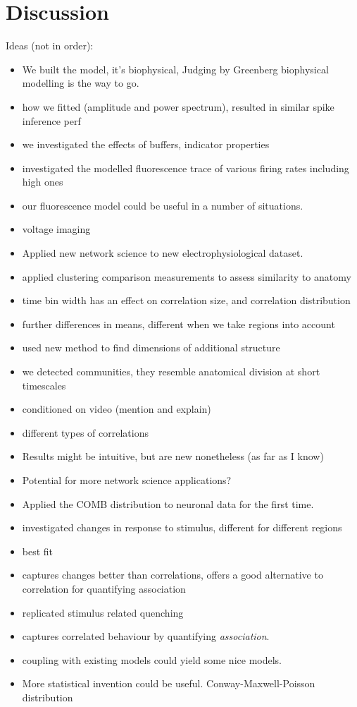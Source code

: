 \chapter{Discussion}
Ideas (not in order):
\begin{itemize}
  \item We built the model, it's biophysical, Judging by Greenberg biophysical modelling is the way to go.
  \item how we fitted (amplitude and power spectrum), resulted in similar spike inference perf
  \item we investigated the effects of buffers, indicator properties
  \item investigated the modelled fluorescence trace of various firing rates including high ones
  \item our fluorescence model could be useful in a number of situations.
  \item voltage imaging
  \item Applied new network science to new electrophysiological dataset.
  \item applied clustering comparison measurements to assess similarity to anatomy
  \item time bin width has an effect on correlation size, and correlation distribution
  \item further differences in means, different when we take regions into account
  \item used new method to find dimensions of additional structure
  \item we detected communities, they resemble anatomical division at short timescales
  \item conditioned on video (mention and explain)
  \item different types of correlations
  \item Results might be intuitive, but are new nonetheless (as far as I know)
  \item Potential for more network science applications?
  \item Applied the COMB distribution to neuronal data for the first time.
  \item investigated changes in response to stimulus, different for different regions
  \item best fit
  \item captures changes better than correlations, offers a good alternative to correlation for quantifying association
  \item replicated stimulus related quenching
  \item captures correlated behaviour by quantifying \textit{association}.
  \item coupling with existing models could yield some nice models.
  \item More statistical invention could be useful. Conway-Maxwell-Poisson distribution
\end{itemize}

